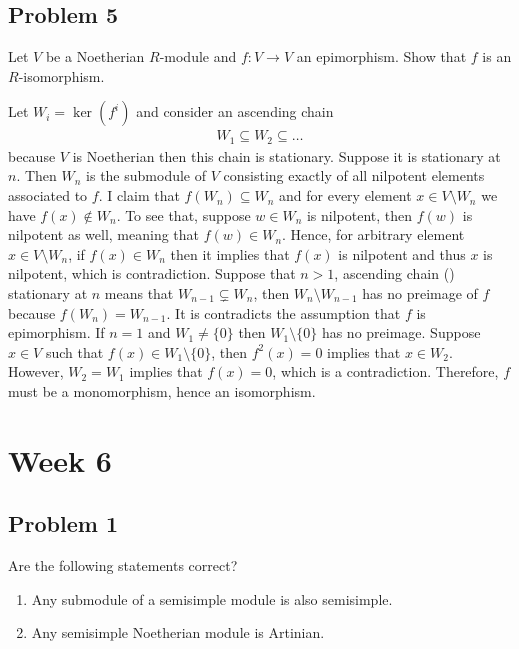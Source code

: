 \subsection*{Problem 5}
Let $V$ be a Noetherian $R$-module and $f : V \to V$ an epimorphism. Show that $f$ is an $R$-isomorphism.

\begin{solution}
    Let $W_i=\ker(f^i)$ and consider an ascending chain
    \begin{align*}
        W_1\subseteq W_2\subseteq\dots \tag{\Gemini}
    \end{align*}
    because $V$ is Noetherian then this chain is stationary. Suppose it is stationary at $n$. 
    Then $W_n$ is the submodule of $V$ consisting exactly of all nilpotent elements associated to $f$.
    I claim that $f(W_n)\subseteq W_n$ and for every element $x\in V\setminus W_n$ we have $f(x)\notin W_n$.
    To see that, suppose $w\in W_n$ is nilpotent, then $f(w)$ is nilpotent as well, meaning that $f(w)\in W_n$.
    Hence, for arbitrary element $x\in V\setminus W_n$, if $f(x)\in W_n$ then it implies that  $f(x)$ is nilpotent and thus $x$ is nilpotent, which is contradiction.
    Suppose that $n>1$, ascending chain (\Gemini) stationary at $n$ means that $W_{n-1}\subsetneq W_{n}$, then $W_n\setminus W_{n-1}$ has no preimage of $f$ because $f(W_n)=W_{n-1}$.
    It is contradicts the assumption that $f$ is epimorphism.
    If $n=1$ and $W_1\neq \{0\}$ then $W_1 \setminus \{0\}$ has no preimage. Suppose $x\in V$ such that $f(x)\in W_1 \setminus \{0\}$, then $f^2(x) = 0$ implies that $x\in W_2$. 
    However, $W_2=W_1$ implies that $f(x)=0$, which is a contradiction. 
    Therefore, $f$ must be a monomorphism, hence an isomorphism. 
\end{solution}
\section{Week 6}

\subsection*{Problem 1}
Are the following statements correct?
\begin{enumerate}
    \item[(1)] Any submodule of a semisimple module is also semisimple.
    \item[(2)] Any semisimple Noetherian module is Artinian.
\end{enumerate}

